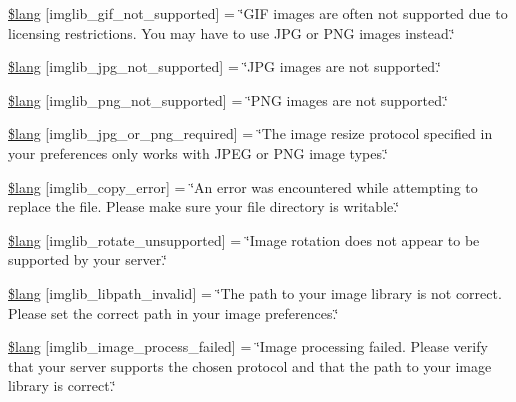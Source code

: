 \begin{DoxyCompactItemize}
\item 
\hyperlink{application_2language_2russian_2imglib__lang_8php_a235a59a6660145fc136b3933b5b10675}{\$lang} \mbox{[}\textquotesingle{}imglib\+\_\+gif\+\_\+not\+\_\+supported\textquotesingle{}\mbox{]} = \char`\"{}G\+IF images are often not supported due to licensing restrictions. You may have to use J\+PG or P\+NG images instead.\char`\"{}
\item 
\hyperlink{application_2language_2russian_2imglib__lang_8php_a4acdc927c172bab1370b2897c667c552}{\$lang} \mbox{[}\textquotesingle{}imglib\+\_\+jpg\+\_\+not\+\_\+supported\textquotesingle{}\mbox{]} = \char`\"{}J\+PG images are not supported.\char`\"{}
\item 
\hyperlink{application_2language_2russian_2imglib__lang_8php_a0b7ea2e2fbd03eb72fe9d969adb643dd}{\$lang} \mbox{[}\textquotesingle{}imglib\+\_\+png\+\_\+not\+\_\+supported\textquotesingle{}\mbox{]} = \char`\"{}P\+NG images are not supported.\char`\"{}
\item 
\hyperlink{application_2language_2russian_2imglib__lang_8php_a2878e2b878871cd8010970f865d70e71}{\$lang} \mbox{[}\textquotesingle{}imglib\+\_\+jpg\+\_\+or\+\_\+png\+\_\+required\textquotesingle{}\mbox{]} = \char`\"{}The image resize protocol specified in your preferences only works with J\+P\+EG or P\+NG image types.\char`\"{}
\item 
\hyperlink{application_2language_2russian_2imglib__lang_8php_a012b6a0d2b3a8ef934e8783d2fbd6535}{\$lang} \mbox{[}\textquotesingle{}imglib\+\_\+copy\+\_\+error\textquotesingle{}\mbox{]} = \char`\"{}An error was encountered while attempting to replace the file. Please make sure your file directory is writable.\char`\"{}
\item 
\hyperlink{application_2language_2russian_2imglib__lang_8php_ab1c77c6b58fc5bf8e979ab4237ec87e7}{\$lang} \mbox{[}\textquotesingle{}imglib\+\_\+rotate\+\_\+unsupported\textquotesingle{}\mbox{]} = \char`\"{}Image rotation does not appear to be supported by your server.\char`\"{}
\item 
\hyperlink{application_2language_2russian_2imglib__lang_8php_a8f190c17a02ca89334c8bf0a04333f65}{\$lang} \mbox{[}\textquotesingle{}imglib\+\_\+libpath\+\_\+invalid\textquotesingle{}\mbox{]} = \char`\"{}The path to your image library is not correct. Please set the correct path in your image preferences.\char`\"{}
\item 
\hyperlink{application_2language_2russian_2imglib__lang_8php_a9ac6659eb97dd12e5c714cc9635cf22e}{\$lang} \mbox{[}\textquotesingle{}imglib\+\_\+image\+\_\+process\+\_\+failed\textquotesingle{}\mbox{]} = \char`\"{}Image processing failed. Please verify that your server supports the chosen protocol and that the path to your image library is correct.\char`\"{}

\end{DoxyCompactItemize}

